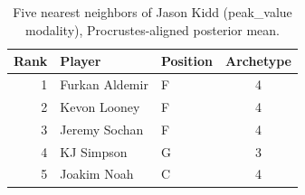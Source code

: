 \begin{table}[htbp]
  \centering\small
  \begin{tabular}{rllc}
    \toprule
    Rank & Player & Position & Archetype \\
    \midrule
    1 & Furkan Aldemir & F & 4 \\
    2 & Kevon Looney & F & 4 \\
    3 & Jeremy Sochan & F & 4 \\
    4 & KJ Simpson & G & 3 \\
    5 & Joakim Noah & C & 4 \\
    \bottomrule
  \end{tabular}
  \caption{Five nearest neighbors of Jason Kidd (peak_value modality), Procrustes-aligned posterior mean.}
  \label{tab:Jason_Kidd_neighbors_peak_value}
\end{table}

